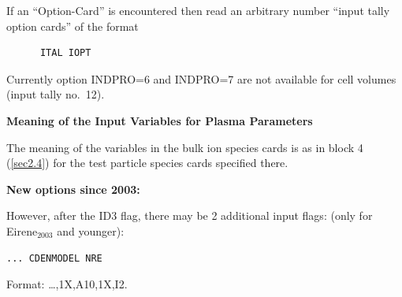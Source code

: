 If an ``Option-Card'' is encountered then
read an arbitrary number ``input tally option cards'' of the format

\begin{lstlisting}
      ITAL IOPT
\end{lstlisting} 

Currently option INDPRO=6 and INDPRO=7 are not available for cell volumes
(input tally no.\ 12).

\medskip

\textbf{Meaning of the Input Variables for Plasma Parameters}

\medskip 

The meaning of the variables in the bulk ion species cards is as in block 4
(\cref{sec2.4}) for the test particle species cards specified there.

\textbf{New options since 2003:} 

However, after the ID3 flag, there may be 2 additional input flags: (only for
Eirene$_{2003}$ and younger):

\begin{lstlisting}
... CDENMODEL NRE
\end{lstlisting}

Format: \dots,1X,A10,1X,I2.

